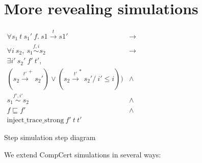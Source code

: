 \section{More revealing simulations}\label{sec:compcert-sim}

\begin{table}\centering

$\begin{array}{rc}
\forall s_1 \ t \ s_1' \ f.  \ s1 \xrightarrow{t} s1' & \rightarrow \\
  \forall i \ s_2, \ s_1 \overset{f, i}{\sim} s_2 &\rightarrow \\
          \exists i' \ s_2' \ f' \ t', & \\
          (s_2 \xrightarrow{t'}^+ s_2') \vee (s_2 \xrightarrow{t'}^* s_2' /\ i' \leq i)) & \wedge\\
          s_1 \overset{f', i'}{\sim} s_2 & \wedge \\
          f \sqsubseteq f'  & \wedge \\
           \text{inject\_trace\_strong} \ f' \ t \ t'


\end{array}$

\caption{Step simulation step diagram}\label{sec:step_diagram_sim}
\end{table}


We extend CompCert simulations in several ways:

